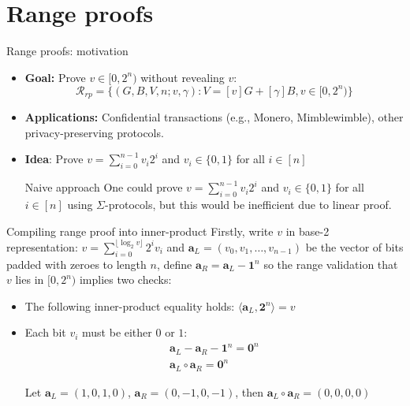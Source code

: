 \documentclass{zkdl-presentation-template}
\begin{document}
    \section{Range proofs}

    \begin{frame}{Range proofs: motivation}
        \begin{itemize}
            \item \textbf{Goal:} Prove $v \in [0, 2^n)$ without revealing $v$:
            $$\mathcal{R}_{rp} = \{ (G, B, V, n; v, \gamma) : V = [v]G + [\gamma]B, v \in [0, 2^n) \}$$\pause
            \item \textbf{Applications:} Confidential transactions (e.g., Monero, Mimblewimble), other privacy-preserving protocols.\pause
            \item \textbf{Idea}: Prove $v = \sum_{i=0}^{n-1} v_i 2^i$ and $v_i \in \{0,1\}$ for all $i \in [n]$\pause
            \begin{block}{Naive approach}
                One could prove $v = \sum_{i=0}^{n-1} v_i 2^i$ and $v_i \in \{0,1\}$ for all $i \in [n]$ using $\Sigma$-protocols, but this would be inefficient due to linear proof.
            \end{block}
        \end{itemize}
    \end{frame}

    \begin{frame}{Compiling range proof into inner-product}
        Firstly, write $v$ in base-2 representation: $v = \sum_{i=0}^{\lfloor \log_2 v \rfloor} 2^i v_i$ and $\mathbf{a}_L = (v_0, v_1, \dots, v_{n-1})$ be the vector of bits padded with zeroes to length $n$, define $\mathbf{a}_R = \mathbf{a}_L - \mathbf{1}^n$ so the range validation that $v$ lies in $[0, 2^n)$ implies two checks:
        \pause
        \begin{itemize}
            \item The following inner-product equality holds: $\langle \mathbf{a}_L, \mathbf{2}^n \rangle = v$\pause
            \item Each bit $v_i$ must be either $0$ or $1$:
            \begin{align*}
            \mathbf{a}_L - \mathbf{a}_R - \mathbf{1}^n = \mathbf{0}^n \\
            \mathbf{a}_L \circ \mathbf{a}_R = \mathbf{0}^n
            \end{align*}
            \pause
            \begin{example}
                Let $\mathbf{a}_L = (1, 0, 1, 0)$, $\mathbf{a}_R = (0, -1, 0, -1)$, then
                $\mathbf{a}_L \circ \mathbf{a}_R = (0, 0, 0, 0)$
            \end{example}
        \end{itemize}
    \end{frame}
\end{document}
